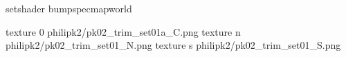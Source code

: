 setshader bumpspecmapworld

texture 0 philipk2/pk02_trim_set01a_C.png
texture n philipk2/pk02_trim_set01_N.png
texture s philipk2/pk02_trim_set01_S.png

